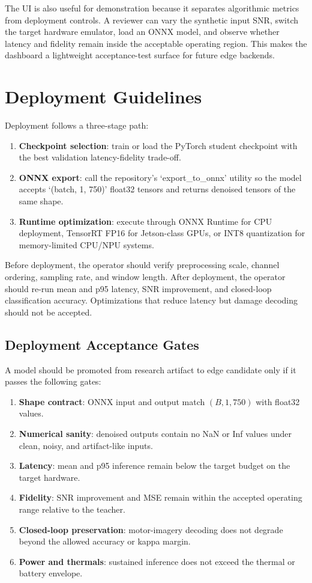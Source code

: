 \documentclass[11pt]{article}
\begin{document}
The UI is also useful for demonstration because it separates algorithmic metrics from deployment controls. A reviewer can vary the synthetic input SNR, switch the target hardware emulator, load an ONNX model, and observe whether latency and fidelity remain inside the acceptable operating region. This makes the dashboard a lightweight acceptance-test surface for future edge backends.

\section{Deployment Guidelines}

Deployment follows a three-stage path:

\begin{enumerate}
    \item \textbf{Checkpoint selection}: train or load the PyTorch student checkpoint with the best validation latency-fidelity trade-off.
    \item \textbf{ONNX export}: call the repository's `export\_to\_onnx' utility so the model accepts `(batch, 1, 750)' float32 tensors and returns denoised tensors of the same shape.
    \item \textbf{Runtime optimization}: execute through ONNX Runtime for CPU deployment, TensorRT FP16 for Jetson-class GPUs, or INT8 quantization for memory-limited CPU/NPU systems.
\end{enumerate}

Before deployment, the operator should verify preprocessing scale, channel ordering, sampling rate, and window length. After deployment, the operator should re-run mean and p95 latency, SNR improvement, and closed-loop classification accuracy. Optimizations that reduce latency but damage decoding should not be accepted.

\subsection{Deployment Acceptance Gates}

A model should be promoted from research artifact to edge candidate only if it passes the following gates:

\begin{enumerate}
    \item \textbf{Shape contract}: ONNX input and output match \((B,1,750)\) with float32 values.
    \item \textbf{Numerical sanity}: denoised outputs contain no NaN or Inf values under clean, noisy, and artifact-like inputs.
    \item \textbf{Latency}: mean and p95 inference remain below the target budget on the target hardware.
    \item \textbf{Fidelity}: SNR improvement and MSE remain within the accepted operating range relative to the teacher.
    \item \textbf{Closed-loop preservation}: motor-imagery decoding does not degrade beyond the allowed accuracy or kappa margin.
    \item \textbf{Power and thermals}: sustained inference does not exceed the thermal or battery envelope.
\end{enumerate}
\end{document}
